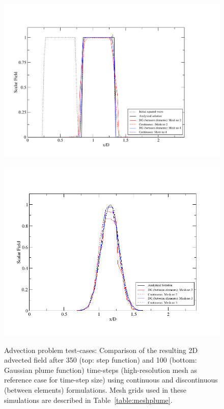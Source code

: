 \begin{figure}[h]
\begin{center}
\vbox{\vspace{-2.cm}\hbox{
\includegraphics[width=15.5cm,height=10.cm]{./diagrams/Step_P1DG-P2Cont}}
\vspace{-.5cm}
\hbox{
\includegraphics[width=15.5cm,height=10.cm]{./diagrams/Plume_P1DG-P2Cont}}}\vspace{-1cm}
\caption{Advection problem test-cases: Comparison of the resulting 2D advected field after 350 (top: step function) and 100 (bottom: Gaussian plume function) time-steps (high-resolution mesh as reference case for time-step size) using continuous and discontinuous (between elements) formulations. Mesh grids used in these simulations are described in Table~\ref{table:meshplume}.\label{2D_Sanpshot_Adv2D}}
\end{center}
\end{figure}



